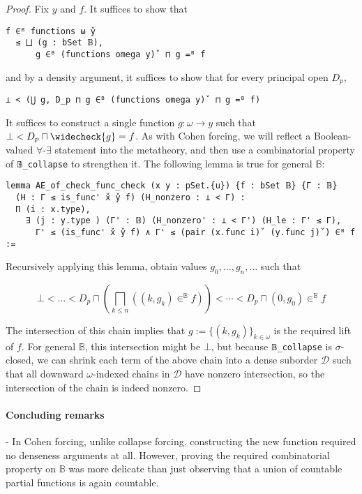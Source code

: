 \documentclass[sigplan,10pt,review, autoref,anonymous]{acmart}
\newcommand{\lil}{\lstinline}
\theoremstyle{definition}
\begin{document}
\begin{proof}
  Fix \(y\) and \(f\). It suffices to show that

\begin{lstlisting}
f ∈ᴮ functions ω y̌
  ≤ ⨆ (g : bSet 𝔹),
      g ∈ᴮ (functions omega y)̌  ⊓ g =ᴮ f
\end{lstlisting}

  and by a density argument, it suffices to show that for every principal open \(D_p\),

\begin{lstlisting}
⊥ < (⋃ g, D_p ⊓ g ∈ᴮ (functions omega y)̌  ⊓ g =ᴮ f)
\end{lstlisting}

  It suffices to construct a single function \(g : \omega \to y\) such that \(\bot < D_p \sqcap \widecheck{g} = f\). As with Cohen forcing, we will reflect a Boolean-valued \(\forall\)-\(\exists\) statement into the metatheory, and then use a combinatorial property of \lil{𝔹_collapse} to strengthen it. The following lemma is true for general \(\mathbb{B}\):

\begin{lstlisting}
lemma AE_of_check_func_check (x y : pSet.{u}) {f : bSet 𝔹} {Γ : 𝔹}
  (H : Γ ≤ is_func' x̌ y̌ f) (H_nonzero : ⊥ < Γ) :
  Π (i : x.type),
    ∃ (j : y.type ) (Γ' : 𝔹) (H_nonzero' : ⊥ < Γ') (H_le : Γ' ≤ Γ),
      Γ' ≤ (is_func' x̌ y̌ f) ∧ Γ' ≤ (pair (x.func i)̌  (y.func j)̌ ) ∈ᴮ f :=
\end{lstlisting}

Recursively applying this lemma, obtain values \(g_0, \dots, g_n, \dots\) such that

\[\bot < \dots < D_p \sqcap \left(\bigsqcap_{k \leq n} ((k, g_k) \in^{\mathbb{B}} f)\right) < \cdots < D_p \sqcap (0 , g_0) \in^{\mathbb{B}} f\]

The intersection of this chain implies that \(g := \{(k, g_k)\}_{k \in \omega}\) is the required lift of \(f\). For general \(\mathbb{B}\), this intersection might be \(\bot\), but because \lil{𝔹_collapse} is \(\sigma\)-closed, we can shrink each term of the above chain into a dense suborder \(\mathcal{D}\) such that all downward \(\omega\)-indexed chains in \(\mathcal{D}\) have nonzero intersection, so the intersection of the chain is indeed nonzero.
\end{proof}

\paragraph{Concluding remarks}
 - In Cohen forcing, unlike collapse forcing, constructing the new function required no denseness arguments at all. However, proving the required combinatorial property on \(\mathbb{B}\) was more delicate than just observing that a union of countable partial functions is again countable.
\end{document}
